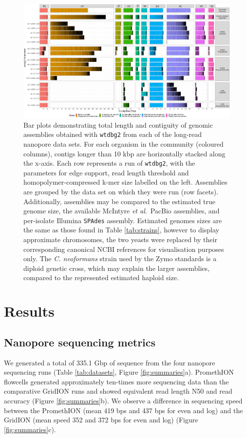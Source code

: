 \documentclass[a4paper,num-refs]{oup-contemporary}
\begin{document}
\begin{figure}[t!]
\centering
\includegraphics[width=\linewidth]{figures/w2.png}
\caption{Bar plots demonstrating total length and contiguity of genomic assemblies obtained with \texttt{wtdbg2} from each of the long-read nanopore data sets. For each organism in the community (coloured columns), contigs longer than 10 kbp are horizontally stacked along the x-axis. Each row represents a run of \texttt{wtdbg2}, with the parameters for edge support, read length threshold and homopolymer-compressed k-mer size labelled on the left. Assemblies are grouped by the data set on which they were run (row facets). Additionally, assemblies may be compared to the estimated true genome size, the available McIntyre \textit{et al}.\ PacBio assemblies, and per-isolate Illumina \texttt{SPAdes} assembly. Estimated genomes sizes are the same as those found in Table \ref{tab:strains}, however to display approximate chromosomes, the two yeasts were replaced by their corresponding canonical NCBI references for visualisation purposes only. The \textit{C. neoformans} strain used by the Zymo standards is a diploid genetic cross, which may explain the larger assemblies, compared to the represented estimated haploid size.
}\label{fig:assemblies}
\end{figure}

\section{Results}

\subsection{Nanopore sequencing metrics}

We generated a total of 335.1 Gbp of sequence from the four nanopore sequencing runs (Table \ref{tab:datasets}, Figure \ref{fig:summaries}a).
PromethION flowcells generated approximately ten-times more sequencing data than the comparative GridION runs and showed equivalent read length N50 and read accuracy (Figure \ref{fig:summaries}b).
We observe a difference in sequencing speed between the PromethION (mean 419 bps and 437 bps for even and log) and the GridION (mean speed 352 and 372 bps for even and log) (Figure \ref{fig:summaries}c).
\end{document}

